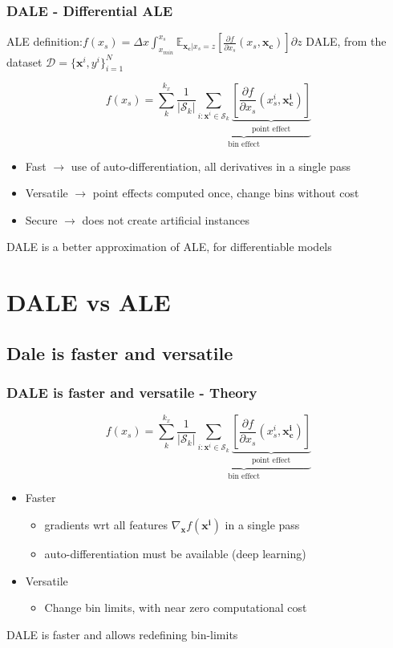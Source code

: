 \documentclass{beamer}
\newcommand{\xb}{\boldsymbol{x}}
\begin{document}
\begin{frame}
  \frametitle{DALE - Differential ALE}
  ALE definition:\(f(x_s) = \Delta x \int_{x_{min}}^{x_s}\mathbb{E}_{\bm{x_c}|x_s=z}[ \frac{\partial f}{\partial x_s}(x_s, \bm{x_c})] \partial z\)
  \noindent\makebox[\linewidth]{\rule{\paperwidth}{0.4pt}}
  DALE, from the dataset \(\mathcal{D} = { \{\bm{x}^i, y^i}\}_{i=1}^N\)

    \[f(x_s) = \sum_k^{k_x} \underbrace{\frac{1}{|\mathcal{S}_k|} \sum_{i:\xb^i \in \mathcal{S}_k} \underbrace{[\frac{\partial f}{\partial x_s}(x_s^i, \bm{x^i_c})]}_{\text{point effect}}}_{\text{bin effect}} \]

    \begin{itemize}
    \item Fast \( \rightarrow \) use of auto-differentiation, all derivatives in a single pass
    \item Versatile \( \rightarrow\) point effects computed once, change bins without cost
    \item Secure \( \rightarrow\) does not create artificial instances
    \end{itemize}

  \noindent\makebox[\linewidth]{\rule{\paperwidth}{0.4pt}}
  DALE is a better approximation of ALE, for \alert{differentiable} models
\end{frame}



\section{DALE vs ALE}

\subsection{Dale is faster and versatile}

\begin{frame}
  \frametitle{DALE is faster and versatile - Theory}
    \[f(x_s) = \sum_k^{k_x} \underbrace{\frac{1}{|\mathcal{S}_k|} \sum_{i:\xb^i \in \mathcal{S}_k} \underbrace{[\frac{\partial f}{\partial x_s}(x_s^i, \bm{x^i_c})]}_{\text{point effect}}}_{\text{bin effect}} \]

  \begin{itemize}
  \item Faster
    \begin{itemize}
      \item gradients wrt all features \(\nabla_{\bm{x}} f(\bm{x^i})\) in a single pass
      \item auto-differentiation must be available (deep learning)
    \end{itemize}
  \item Versatile
    \begin{itemize}
    \item Change bin limits, with near zero computational cost
    \end{itemize}

  \end{itemize}
  \noindent\makebox[\linewidth]{\rule{\paperwidth}{0.4pt}}
  DALE is faster and allows redefining bin-limits
\end{frame}
\end{document}
